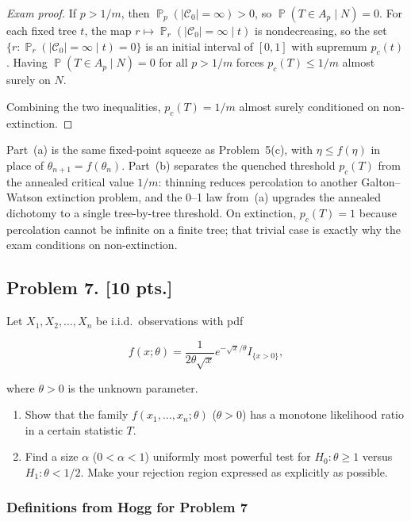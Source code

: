 \documentclass[11pt,a4paper]{article}
\DeclareMathOperator{\Pbb}{\mathbb{P}}
\begin{document}
\begin{proof}[Exam proof]
If \(p>1/m\), then \(\Pbb_p(|\mathcal{C}_0|=\infty)>0\), so \(\Pbb(T\in A_p\mid N)=0\). For each fixed tree \(t\), the map \(r\mapsto \Pbb_r(|\mathcal{C}_0|=\infty\mid t)\) is nondecreasing, so the set \(\{r:\Pbb_r(|\mathcal{C}_0|=\infty\mid t)=0\}\) is an initial interval of \([0,1]\) with supremum \(p_c(t)\). Having \(\Pbb(T\in A_p\mid N)=0\) for all \(p>1/m\) forces \(p_c(T)\le 1/m\) almost surely on \(N\).

Combining the two inequalities, \(p_c(T)=1/m\) almost surely conditioned on non-extinction.
\end{proof}

\begin{remark}
\label{rem:p6-checks}
Part~(a) is the same fixed-point squeeze as Problem~5(c), with \(\eta\le f(\eta)\) in place of \(\theta_{n+1}=f(\theta_n)\). Part~(b) separates the quenched threshold \(p_c(T)\) from the annealed critical value \(1/m\): thinning reduces percolation to another Galton--Watson extinction problem, and the 0--1 law from~(a) upgrades the annealed dichotomy to a single tree-by-tree threshold. On extinction, \(p_c(T)=1\) because percolation cannot be infinite on a finite tree; that trivial case is exactly why the exam conditions on non-extinction.
\end{remark}

\subsection{Problem 7. [10 pts.]}
Let \( X_1, X_2, \dots, X_n \) be i.i.d.\ observations with pdf

\[
f(x; \theta) = \frac{1}{2\theta\sqrt{x}} e^{-\sqrt{x}/\theta} I_{\{x>0\}},
\]

where \( \theta > 0 \) is the unknown parameter.
\begin{enumerate}[label=(\alph*)]
    \item Show that the family \( f(x_1, \dots, x_n; \theta) \) (\( \theta > 0 \)) has a monotone likelihood ratio in a certain statistic \( T \).
    \item Find a size \( \alpha \) (\( 0 < \alpha < 1 \)) uniformly most powerful test for \( H_0 : \theta \ge 1 \) versus \( H_1 : \theta < 1/2 \). Make your rejection region expressed as explicitly as possible.
\end{enumerate}

\setcounter{section}{7}
\setcounter{definition}{0}

\subsubsection{Definitions from Hogg for Problem 7}
\end{document}
